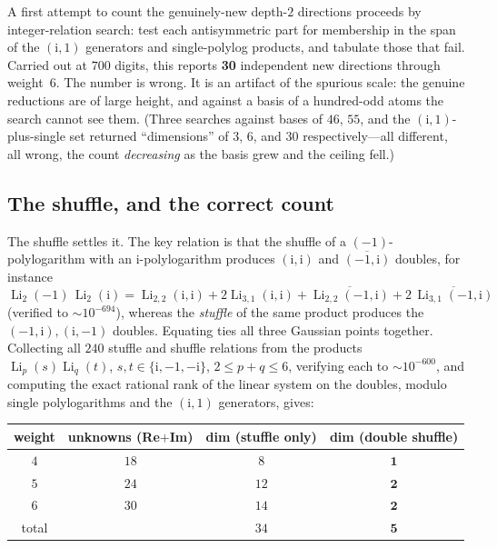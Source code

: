 \documentclass[11pt]{article}
\DeclareMathOperator{\Li}{Li}
\newcommand{\iu}{\mathrm{i}}
\theoremstyle{plain}
\theoremstyle{remark}
\begin{document}
A first attempt to count the genuinely-new depth-$2$ directions proceeds by integer-relation search:
test each antisymmetric part for membership in the span of the $(\iu,1)$ generators and single-polylog
products, and tabulate those that fail. Carried out at $700$ digits, this reports \textbf{30}
independent new directions through weight~$6$. The number is wrong. It is an artifact of the spurious
scale: the genuine reductions are of large height, and against a basis of a hundred-odd atoms the
search cannot see them. (Three searches against bases of $46$, $55$, and the $(\iu,1)$-plus-single set
returned ``dimensions'' of $3$, $6$, and $30$ respectively---all different, all wrong, the count
\emph{decreasing} as the basis grew and the ceiling fell.)

\subsection{The shuffle, and the correct count}

The shuffle settles it. The key relation is that the shuffle of a $(-1)$-polylogarithm with an
$\iu$-polylogarithm produces $(\iu,\iu)$ and $\overline{(-1,\iu)}$ doubles, for instance
\begin{equation}\label{eq:shuffle-22}
  \Li_2(-1)\,\Li_2(\iu)=\Li_{2,2}(\iu,\iu)+2\Li_{3,1}(\iu,\iu)
     +\overline{\Li_{2,2}(-1,\iu)}+2\,\overline{\Li_{3,1}(-1,\iu)}
\end{equation}
(verified to ${\sim}10^{-694}$), whereas the \emph{stuffle} of the same product produces the
$(-1,\iu),(\iu,-1)$ doubles. Equating ties all three Gaussian points together. Collecting all $240$
stuffle and shuffle relations from the products $\Li_p(s)\Li_q(t)$, $s,t\in\{\iu,-1,-\iu\}$,
$2\le p+q\le6$, verifying each to ${\sim}10^{-600}$, and computing the exact rational rank of the
linear system on the doubles, modulo single polylogarithms and the $(\iu,1)$ generators, gives:

\begin{center}
\renewcommand{\arraystretch}{1.2}
\begin{tabular}{c c c c}
\hline
weight & unknowns (Re$+$Im) & dim (stuffle only) & dim (double shuffle)\\
\hline
$4$ & $18$ & $8$  & $\mathbf 1$\\
$5$ & $24$ & $12$ & $\mathbf 2$\\
$6$ & $30$ & $14$ & $\mathbf 2$\\
\hline
total & & $34$ & $\mathbf 5$\\
\hline
\end{tabular}
\end{center}
\end{document}
